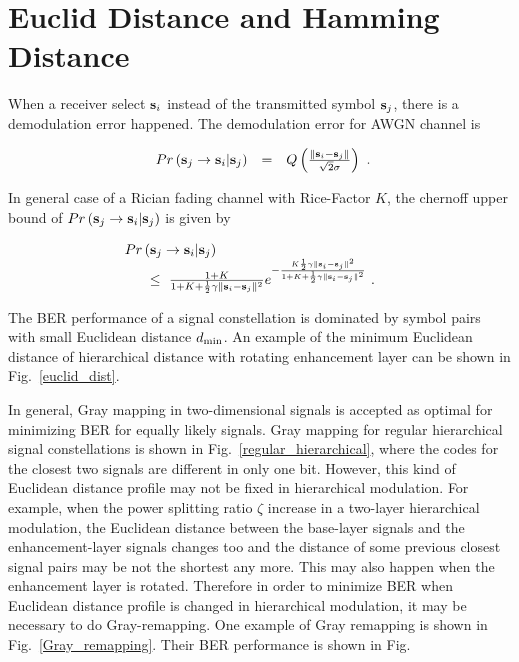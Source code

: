 \documentclass[10pt,fleqn, twocolumn]{IEEEtran}
\newcommand{\bs}{{\bf s}}
\begin{document}
\section{Euclid Distance and Hamming Distance}
When a receiver select $\bs_i$ instead of the transmitted symbol
$\bs_j$, there is a demodulation error happened. The demodulation
error for AWGN channel is

\begin{equation}
\begin{array}{rcl}
Pr\left(\bs_{j}\rightarrow\bs_{i}|\bs_{j}\right)&=&Q\left(\frac{\|\bs_{i}-\bs_{j}\|}{\sqrt{2}\sigma}\right)
\end{array}.\label{prior_error}
\end{equation}

\noindent In general case of a Rician fading channel with
Rice-Factor $K$, the chernoff upper bound of
$Pr\left(\bs_{j}\rightarrow\bs_{i}|\bs_{j}\right)$ is given by

\begin{equation}
\begin{array}{ll}
\hspace{-0.2in}Pr\left(\bs_{j}\rightarrow\bs_{i}|\bs_{j}\right)&\\
&\hspace{-0.8in}\leq\
\frac{1+K}{1+K+\frac{1}{2}\gamma\|\bs_{i}-\bs_{j}\|^2}e^{-\frac{K\frac{1}{2}\gamma\|\bs_{i}-\bs_{j}\|^2}{1+K+\frac{1}{2}\gamma\|\bs_{i}-\bs_{j}\|^2}}\
.
\end{array}\label{prior_error_fading}
\end{equation}


\noindent The BER performance of a signal constellation is
dominated by symbol pairs with small Euclidean distance $d_{\rm
min}$. An example of the minimum Euclidean distance of
hierarchical distance with rotating enhancement layer can be shown
in Fig.~\ref{euclid_dist}.

In general, Gray mapping in two-dimensional signals is accepted as
optimal for minimizing BER for equally likely signals. Gray
mapping for regular hierarchical signal constellations is shown in
Fig.~\ref{regular_hierarchical}, where the codes for the closest
two signals are different in only one bit. However, this kind of
Euclidean distance profile may not be fixed in hierarchical
modulation. For example, when the power splitting ratio $\zeta$
increase in a two-layer hierarchical modulation, the Euclidean
distance between the base-layer signals and the enhancement-layer
signals changes too and the distance of some previous closest
signal pairs may be not the shortest any more. This may also
happen when the enhancement layer is rotated. Therefore in order
to minimize BER when Euclidean distance profile is changed in
hierarchical modulation, it may be necessary to do Gray-remapping.
One example of Gray remapping is shown in
Fig.~\ref{Gray_remapping}. Their BER performance is shown in Fig.
\end{document}
